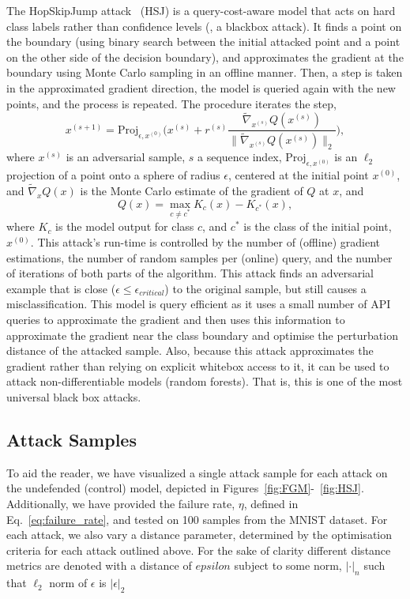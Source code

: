 The HopSkipJump attack~\cite{hopskipjump} (HSJ) is a query-cost-aware model that acts on hard class labels rather than confidence levels (\ie, a blackbox attack).
It finds a point on the boundary (using binary search between the initial attacked point and a point on the other side of the decision boundary), and approximates the gradient at the boundary using Monte Carlo sampling in an offline manner.
Then, a step is taken in the approximated gradient direction, the model is queried again with the new points, and the process is repeated.
The procedure iterates the step,
$$
   x^{(s+1)} = \mathrm{Proj}_{\epsilon,x^{(0)}}\Bigg( x^{(s)} + r^{(s)} \frac{\widetilde{\nabla}_{x^{(s)}}  Q(x^{(s)}) }{\big\|\widetilde{\nabla}_{x^{(s)}} Q(x^{(s)}) \big\|_2}\Bigg),
$$
where $x^{(s)}$ is an adversarial sample, $s$ a sequence index, $\mathrm{Proj}_{\epsilon,x^{(0)}}$ is an $\ell_2$ projection of a point onto a sphere of radius $\epsilon$, centered at the initial point $x^{(0)}$, and $\widetilde{\nabla}_xQ(x)$ is the Monte Carlo estimate of the gradient of $Q$ at $x$, and
$$
    Q(x) = \max_{c\neq c^*} K_c(x) - K_{c^*}(x),
$$
where $K_{c}$ is the model output for class $c$, and $c^*$ is the class of the initial point, $x^{(0)}$.
This attack's run-time is controlled by the number of (offline) gradient estimations, the number of random samples per (online) query, and the number of iterations of both parts of the algorithm.
This attack finds an adversarial example that is close ($\epsilon \leq \epsilon_{critical}$) to the original sample, but still causes a misclassification.
This model is query efficient as it uses a small number of API queries to approximate the gradient and then uses this information to approximate the gradient near the class boundary and optimise the perturbation distance of the attacked sample.
Also, because this attack approximates the gradient rather than relying on explicit whitebox access to it, it can be used to attack non-differentiable models (\eg random forests).
That is, this is one of the most universal black box attacks.

\subsection{Attack Samples}
To aid the reader, we have visualized a single attack sample for each attack on the undefended (control) model, depicted in Figures~\ref{fig:FGM}-~\ref{fig:HSJ}.
Additionally, we have provided the failure rate, $\eta$, defined in Eq.~\ref{eq:failure_rate}, and tested on 100 samples from the MNIST dataset.
For each attack, we also vary a distance parameter, determined by the optimisation criteria for each attack outlined above.
For the sake of clarity different distance metrics are denoted with a distance of $epsilon$ subject to some norm, $| \cdot |_n$ such that $\ell_2$ norm of ${\epsilon}$ is $ | \epsilon |_2$

